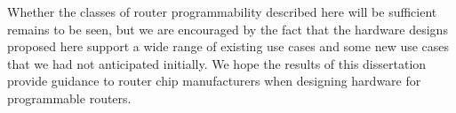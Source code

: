 Whether the classes of router programmability described here will be sufficient
remains to be seen, but we are encouraged by the fact that the hardware designs
proposed here support a wide range of existing use cases and some new use cases
that we had not anticipated initially. We hope the results of this dissertation
provide guidance to router chip manufacturers when designing hardware for
programmable routers.

